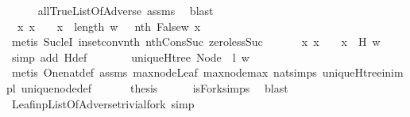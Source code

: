 \begin{isabellebody}
\ \ \ \ \isamarkupfalse%
\ all{\isacharunderscore}True{\isacharunderscore}ListOfAdverse\ assms{\isacharparenleft}{}{\isacharparenright}\ \isamarkupfalse%
\ blast\isanewline
\ \ \isamarkupfalse%
\ \isamarkupfalse%
\ {\isachardoublequoteopen}{\isasymexists}\ x{\isachardot}\ x\ {\isachargreater}\ {}\ {\isasymand}\ x\ {\isasymle}\ length\ w\ {\isasymand}\ {\isasymnot}\ {\isacharparenleft}nth\ {\isacharparenleft}False{\isacharhash}w{\isacharparenright}\ x{\isacharparenright}{\isachardoublequoteclose}\isanewline
\ \ \ \ \isamarkupfalse%
\ {\isacharparenleft}metis\ Suc{\isacharunderscore}leI\ in{\isacharunderscore}set{\isacharunderscore}conv{\isacharunderscore}nth\ nth{\isacharunderscore}Cons{\isacharunderscore}Suc\ zero{\isacharunderscore}less{\isacharunderscore}Suc{\isacharparenright}\isanewline
\ \ \isamarkupfalse%
\ \isamarkupfalse%
\ {\isachardoublequoteopen}{\isasymexists}\ x{\isachardot}\ x\ {\isachargreater}\ {}\ {\isasymand}\ x\ {\isasymin}\ H\ w{\isachardoublequoteclose}\isanewline
\ \ \ \ \isamarkupfalse%
\ {\isacharparenleft}simp\ add{\isacharcolon}\ H{\isacharunderscore}def{\isacharparenright}\ \isanewline
\ \ \isamarkupfalse%
\ \isamarkupfalse%
\ {\isachardoublequoteopen}{\isasymnot}\ uniqueH{\isacharunderscore}tree\ {\isacharparenleft}Node\ {}\ l{\isacharparenright}\ w{\isachardoublequoteclose}\isanewline
\ \ \ \ \isamarkupfalse%
\ {\isacharparenleft}metis\ One{\isacharunderscore}nat{\isacharunderscore}def\ assms{\isacharparenleft}{}{\isacharparenright}\ max{\isacharunderscore}node{\isacharunderscore}Leaf\ max{\isacharunderscore}node{\isacharunderscore}max\ nat{\isachardot}simps{\isacharparenleft}{}{\isacharparenright}\ uniqueH{\isacharunderscore}tree{\isacharunderscore}in{\isacharunderscore}imp{\isacharunderscore}l\ unique{\isacharunderscore}node{\isacharunderscore}def{\isacharparenright}\ \isanewline
\ \ \isamarkupfalse%
\ \isamarkupfalse%
\ {\isacharquery}thesis\isanewline
\ \ \ \ \isamarkupfalse%
\ isFork{\isachardot}simps\ \isamarkupfalse%
\ blast\isanewline
{}\isamarkupfalse%
%
\endisatagproof
{\isafoldproof}%
%
\isadelimproof
\ \ \ \ \isanewline
%
\endisadelimproof
\ \ \ \ \isanewline
{}\isamarkupfalse%
\ Leaf{\isacharunderscore}inp{\isacharunderscore}ListOfAdverse{\isacharunderscore}trivial{\isacharunderscore}fork\ {\isacharbrackleft}simp{\isacharbrackright}{\isacharcolon}\isanewline

\end{isabellebody}
